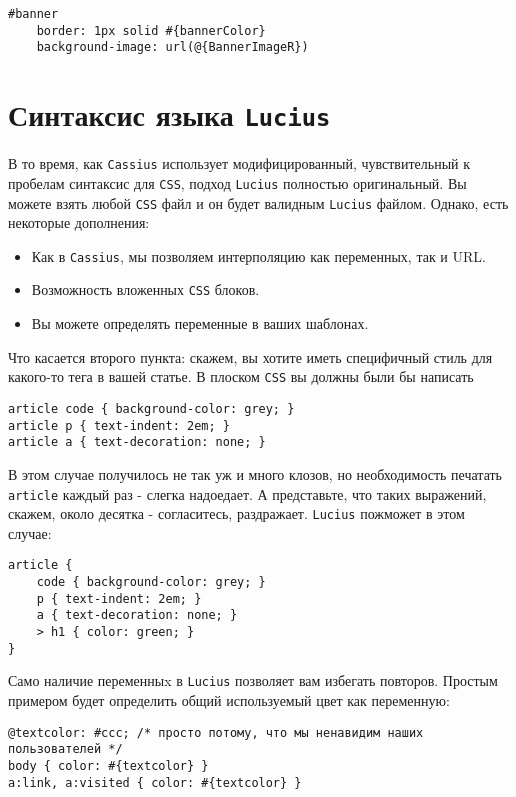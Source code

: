 \begin{lstlisting}
#banner
    border: 1px solid #{bannerColor}
    background-image: url(@{BannerImageR})
\end{lstlisting}

\section{Синтаксис языка \texttt{Lucius}}

В то время, как \texttt{Cassius} использует модифицированный, чувствительный к
пробелам синтаксис для \texttt{CSS}, подход \texttt{Lucius} полностью
оригинальный. Вы можете взять любой \texttt{CSS} файл и он будет валидным
\texttt{Lucius} файлом. Однако, есть некоторые дополнения:

\begin{itemize}
    \item Как в \texttt{Cassius}, мы позволяем интерполяцию как переменных, так
        и URL.
    \item Возможность вложенных \texttt{CSS} блоков.
    \item Вы можете определять переменные в ваших шаблонах.
\end{itemize}

Что касается второго пункта: скажем, вы хотите иметь специфичный стиль для
какого-то тега в вашей статье. В плоском \texttt{CSS} вы должны были бы
написать

\begin{lstlisting}
article code { background-color: grey; }
article p { text-indent: 2em; }
article a { text-decoration: none; }
\end{lstlisting}

В этом случае получилось не так уж и много клозов, но необходимость печатать
\texttt{article} каждый раз - слегка надоедает. А представьте, что таких
выражений, скажем, около десятка - согласитесь, раздражает.  \texttt{Lucius}
пожможет в этом случае:

\begin{lstlisting}
article {
    code { background-color: grey; }
    p { text-indent: 2em; }
    a { text-decoration: none; }
    > h1 { color: green; }
}
\end{lstlisting}

Само наличие переменныx в \texttt{Lucius} позволяет вам избегать повторов.
Простым примером будет определить общий используемый цвет как переменную:

\begin{lstlisting}
@textcolor: #ccc; /* просто потому, что мы ненавидим наших пользователей */
body { color: #{textcolor} }
a:link, a:visited { color: #{textcolor} }
\end{lstlisting}

